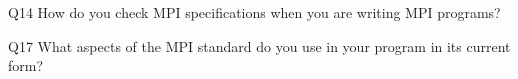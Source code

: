\begin{description}%
\item{Q14} How do you check MPI specifications when you are writing MPI programs?%
\item{Q17} What aspects of the MPI standard do you use in your program in its current form?%
\end{description}%
